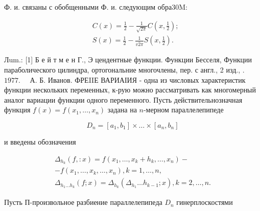\documentclass[10pt]{article}
\begin{document}
Ф. и. связаны с обобщенными Ф. и. следующим обра30M:



\[

\begin{aligned}

& C(x)=\frac{1}{2}-\frac{1}{\sqrt{2 \pi}} C\left(x, \frac{1}{2}\right) ; \\

& S(x)=\frac{1}{2}-\frac{1}{v \overline{2} \pi} S\left(x, \frac{1}{2}\right) .

\end{aligned}

\]



Лum.: [1] Б е й т м е н Г., Э цендентные функции. Функции Бесселя, Функции параболического цилиндра, ортогональние многочлены, пер. с англ., 2 изд., . $1977 . \quad$ А. Б. Иванов. ФРЕIIЕ ВАРИАІИЯ - одна из числовых характеристик функции нескольких переменных, к-рую можно рассматривать как многомерный аналог вариации функции одного переменного. Пусть действительнозначная функция $f(x)=f\left(x_{1}, \ldots, x_{n}\right)$ задана на $n$-мерном параллелепипеде



\[

D_{n}=\left[a_{1}, b_{1}\right] \times \ldots \times\left[a_{n}, b_{n}\right]

\]



и введены обозначения



\[

\begin{gathered}

\Delta_{h_{k}}(f,: x)=f\left(x_{1}, \ldots, x_{k}+h_{k}, \ldots, x_{n}\right)- \\

-f\left(x_{1}, \ldots, x_{k}, \ldots, x_{n}\right), k=1, \ldots, n, \\

\Delta_{h_{1} \ldots h_{k}}(f ; x)=\Delta_{h_{k}}\left(\Delta_{h_{1}} \ldots h_{k-1} ; x\right), k=2, \ldots, n .

\end{gathered}

\]



Пусть П-произвольное разбиение параллелепипеда $D_{n}$ гинерплоскостями
\end{document}
